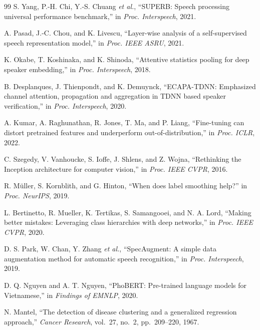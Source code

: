 \documentclass[conference]{IEEEtran}
\begin{document}
\begin{thebibliography}{99}
S. Yang, P.-H. Chi, Y.-S. Chuang \textit{et al.}, ``SUPERB: Speech processing universal performance benchmark,'' in \textit{Proc. Interspeech}, 2021.

A. Pasad, J.-C. Chou, and K. Livescu, ``Layer-wise analysis of a self-supervised speech representation model,'' in \textit{Proc. IEEE ASRU}, 2021.

K. Okabe, T. Koshinaka, and K. Shinoda, ``Attentive statistics pooling for deep speaker embedding,'' in \textit{Proc. Interspeech}, 2018.

B. Desplanques, J. Thienpondt, and K. Demuynck, ``ECAPA-TDNN: Emphasized channel attention, propagation and aggregation in TDNN based speaker verification,'' in \textit{Proc. Interspeech}, 2020.

A. Kumar, A. Raghunathan, R. Jones, T. Ma, and P. Liang, ``Fine-tuning can distort pretrained features and underperform out-of-distribution,'' in \textit{Proc. ICLR}, 2022.

C. Szegedy, V. Vanhoucke, S. Ioffe, J. Shlens, and Z. Wojna, ``Rethinking the Inception architecture for computer vision,'' in \textit{Proc. IEEE CVPR}, 2016.

R. M\"uller, S. Kornblith, and G. Hinton, ``When does label smoothing help?'' in \textit{Proc. NeurIPS}, 2019.

L. Bertinetto, R. Mueller, K. Tertikas, S. Samangooei, and N. A. Lord, ``Making better mistakes: Leveraging class hierarchies with deep networks,'' in \textit{Proc. IEEE CVPR}, 2020.

D. S. Park, W. Chan, Y. Zhang \textit{et al.}, ``SpecAugment: A simple data augmentation method for automatic speech recognition,'' in \textit{Proc. Interspeech}, 2019.

D. Q. Nguyen and A. T. Nguyen, ``PhoBERT: Pre-trained language models for Vietnamese,'' in \textit{Findings of EMNLP}, 2020.

N. Mantel, ``The detection of disease clustering and a generalized regression approach,'' \textit{Cancer Research}, vol.~27, no.~2, pp.~209--220, 1967.

\end{thebibliography}
\end{document}
